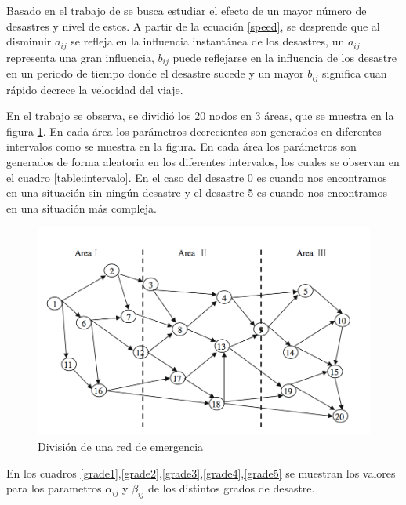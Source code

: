 \documentclass[letter, 10pt]{article}
\begin{document}
Basado en el trabajo de \cite{Yuan20091081} se busca estudiar el efecto de un mayor número de desastres y nivel de estos. A partir de la ecuación \eqref{speed}, se desprende que al disminuir $a_{ij}$ se refleja en la influencia instantánea de los desastres, un  $a_{ij}$ representa una gran influencia, $b_{ij}$ puede reflejarse en la influencia de los desastre en un periodo de tiempo donde el desastre sucede y un mayor $b_{ij}$ significa cuan rápido decrece la velocidad del viaje.


En el trabajo \cite{Yuan20091081} se observa, se dividió los 20 nodos en 3 áreas, que se muestra en la figura \ref{area3}. En cada área los parámetros decrecientes son generados en diferentes intervalos como se muestra en la figura. En cada área los parámetros son generados de forma aleatoria en los diferentes intervalos, los cuales se observan en el cuadro \ref{table:intervalo}. En el caso del desastre 0 es cuando nos encontramos en una situación sin ningún desastre y el desastre 5 es cuando nos encontramos en una situación más compleja.

\begin{figure}[H]
\centering
\includegraphics[scale=0.5]{images/areas.jpg}
\caption{División de una red de emergencia}\label{area3}

\end{figure}

En los cuadros \ref{grade1},\ref{grade2},\ref{grade3},\ref{grade4},\ref{grade5} se muestran los valores para los parametros $\alpha_{ij}$ y $\beta_{ij}$	de los distintos grados de desastre.
\end{document}
